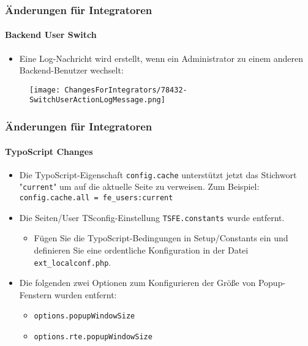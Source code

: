 \begin{frame}[fragile]
	\frametitle{Änderungen für Integratoren}
	\framesubtitle{Backend User Switch}

	\begin{itemize}
		\item Eine Log-Nachricht wird erstellt, wenn ein Administrator zu einem anderen Backend-Benutzer wechselt:
	\end{itemize}

	\begin{figure}
		\texttt{[image: ChangesForIntegrators/78432-SwitchUserActionLogMessage.png]}
	\end{figure}

\end{frame}


\begin{frame}[fragile]
	\frametitle{Änderungen für Integratoren}
	\framesubtitle{TypoScript Changes}

	\begin{itemize}
		\item Die TypoScript-Eigenschaft \texttt{config.cache}  unterstützt jetzt das Stichwort
			"\texttt{current}" um auf die aktuelle Seite zu verweisen. Zum Beispiel:\newline
			\smaller\texttt{config.cache.all = fe\_users:current}\normalsize

		\item Die Seiten/User TSconfig-Einstellung \texttt{TSFE.constants} wurde entfernt.

			\begin{itemize}\smaller
				\item[\ding{228}]Fügen Sie die TypoScript-Bedingungen in Setup/Constants ein und definieren Sie eine ordentliche Konfiguration in der Datei \texttt{ext\_localconf.php}.
			\end{itemize}

		\item Die folgenden zwei Optionen zum Konfigurieren der Größe von Popup-Fenstern wurden entfernt:

			\begin{itemize}
				\item \texttt{options.popupWindowSize}
				\item \texttt{options.rte.popupWindowSize}
			\end{itemize}

	\end{itemize}

\end{frame}

